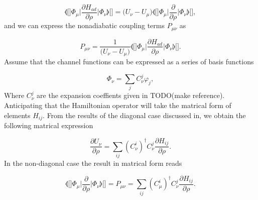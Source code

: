 \begin{equation}\label{derivaham}
\llangle[\bigg]  \Phi_{\mu}\bigg\lvert \frac{\partial H_{ad}}{\partial \rho} \bigg\rvert \Phi_{\nu} \rrangle[\bigg]= \big(U_{\nu}-U_{\mu}\big) \llangle[\bigg]  \Phi_{\mu} \bigg\lvert \frac{\partial}{\partial \rho} \bigg\rvert \Phi_{\nu} \rrangle[\bigg],
\end{equation}
and we can express the nonadiabatic coupling terms $P_{\mu \nu}$ as

\begin{equation}
P_{\mu \nu} = \frac{1}{\big(U_{\nu}-U_{\mu}\big)}\llangle[\bigg]  \Phi_{\mu} \bigg\lvert \frac{\partial H_{ad}}{\partial \rho} \bigg\rvert \Phi_{\nu}\rrangle[\bigg].
\end{equation}
Assume that the channel functions can be expressed as a series of basis functions

\begin{equation}
\Phi_{\nu} = \sum_{j}C_{\nu}^j \varphi_j,
\end{equation} 
Where $C_{\nu}^{j}$ are the expansion coeffients given in TODO(make reference). Anticipating that the Hamiltonian operator will take the matrical form of elements $H_{ij}$. From the results of the diagonal case discussed in, we obtain the following matrical expression \cite{Sanz-Sanz}

\begin{equation}
\frac{\partial U_{\nu}}{\partial \rho} = \sum_{ij}(C_{\nu}^i)^{\dagger}C_{\nu}^j \frac{\partial H_{ij}}{\partial \rho}.
\end{equation}
In the non-diagonal case the result in matrical form reads 

\begin{equation}
\llangle[\bigg]  \Phi_{\mu} \bigg\lvert \frac{\partial}{\partial \rho} \bigg\rvert \Phi_{\nu} \rrangle[\bigg] = P_{\mu \nu} = \sum_{ij}(C_{\mu}^i)^{\dagger}C_{\nu}^j \frac{\partial H_{ij}}{\partial \rho}.
\end{equation}
